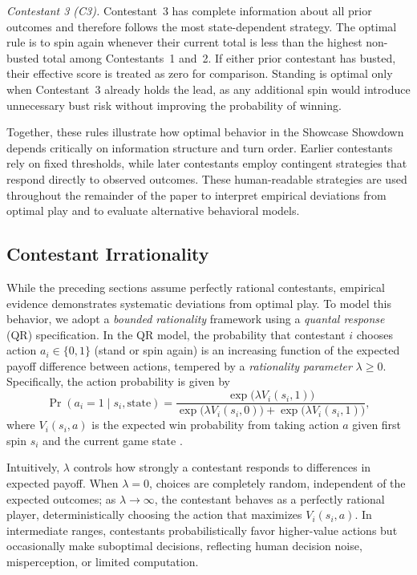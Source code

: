 \documentclass[titlepage,12pt]{article}
\begin{document}
\emph{Contestant 3 (C3).}
Contestant~3 has complete information about all prior outcomes and therefore follows the most state-dependent strategy. The optimal rule is to spin again whenever their current total is less than the highest non-busted total among Contestants~1 and~2. If either prior contestant has busted, their effective score is treated as zero for comparison. Standing is optimal only when Contestant~3 already holds the lead, as any additional spin would introduce unnecessary bust risk without improving the probability of winning.

Together, these rules illustrate how optimal behavior in the Showcase Showdown depends critically on information structure and turn order. Earlier contestants rely on fixed thresholds, while later contestants employ contingent strategies that respond directly to observed outcomes. These human-readable strategies are used throughout the remainder of the paper to interpret empirical deviations from optimal play and to evaluate alternative behavioral models.

\subsection{Contestant Irrationality}

While the preceding sections assume perfectly rational contestants, empirical evidence demonstrates systematic deviations from optimal play. To model this behavior, we adopt a \emph{bounded rationality} framework using a \emph{quantal response} (QR) specification. In the QR model, the probability that contestant $i$ chooses action $a_i \in \{0,1\}$ (stand or spin again) is an increasing function of the expected payoff difference between actions, tempered by a \emph{rationality parameter} $\lambda \ge 0$. Specifically, the action probability is given by
\[
\Pr(a_i = 1 \mid s_i, \text{state}) 
= \frac{\exp\!\big(\lambda V_i(s_i,1)\big)}{\exp\!\big(\lambda V_i(s_i,0)\big) + \exp\!\big(\lambda V_i(s_i,1)\big)},
\]
where $V_i(s_i,a)$ is the expected win probability from taking action $a$ given first spin $s_i$ and the current game state \cite{Evans2024}.

Intuitively, $\lambda$ controls how strongly a contestant responds to differences in expected payoff. When $\lambda = 0$, choices are completely random, independent of the expected outcomes; as $\lambda \to \infty$, the contestant behaves as a perfectly rational player, deterministically choosing the action that maximizes $V_i(s_i,a)$. In intermediate ranges, contestants probabilistically favor higher-value actions but occasionally make suboptimal decisions, reflecting human decision noise, misperception, or limited computation.
\end{document}

